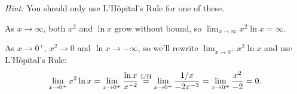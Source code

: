 \documentclass{article}
\begin{document}
\begin{enumerate}
\begin{problem}[\vfill]
      \emph{Hint:} You should only use L'H\^opital's Rule for one of these.
    \end{problem}

    \begin{solution}
      As $x \to \infty$, both $x^2$ and $\ln x$ grow without bound, so 
      $\boxed{ \lim_{x\to\infty} x^2\ln x =  \infty}$. 

      As $x \to 0^+$, $x^2 \to 0$ and $\ln x \to -\infty$, so we'll
      rewrite $\displaystyle \lim_{x \to 0^+} x^2 \ln x$ and use
      L'H\^opital's Rule: 
      \[ \lim_{x \to 0^+} x^2 \ln x = \lim_{x\to0^+} \frac{\ln x}{x^{-2}}
      \stackrel{\text{L'H}}{=} \lim_{x\to0^+} \frac{1/x}{-2x^{-3}} = \lim_{x\to0^+}
      \frac{x^2}{-2} = 0.\]
    \end{solution}




\end{enumerate}
\end{document}
